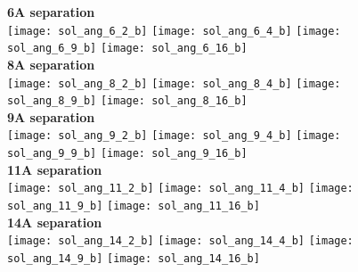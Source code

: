 \documentclass[journal=acsnano,manuscript=article]{achemso}
\begin{document}
\begin{figure}[h!]
	\centering
	\textbf{6A separation} \\
	\texttt{[image: sol\_ang\_6\_2\_b]}
	\texttt{[image: sol\_ang\_6\_4\_b]}
	\texttt{[image: sol\_ang\_6\_9\_b]}
	\texttt{[image: sol\_ang\_6\_16\_b]}
	\\ \textbf{8A separation} \\
	\texttt{[image: sol\_ang\_8\_2\_b]}
	\texttt{[image: sol\_ang\_8\_4\_b]}
	\texttt{[image: sol\_ang\_8\_9\_b]}
	\texttt{[image: sol\_ang\_8\_16\_b]}
	\\ \textbf{9A separation} \\
	\texttt{[image: sol\_ang\_9\_2\_b]}
	\texttt{[image: sol\_ang\_9\_4\_b]}
	\texttt{[image: sol\_ang\_9\_9\_b]}
	\texttt{[image: sol\_ang\_9\_16\_b]}
	\\ \textbf{11A separation} \\
	\texttt{[image: sol\_ang\_11\_2\_b]}
	\texttt{[image: sol\_ang\_11\_4\_b]}
	\texttt{[image: sol\_ang\_11\_9\_b]}
	\texttt{[image: sol\_ang\_11\_16\_b]}
	\\ \textbf{14A separation} \\
	\texttt{[image: sol\_ang\_14\_2\_b]}
	\texttt{[image: sol\_ang\_14\_4\_b]}
	\texttt{[image: sol\_ang\_14\_9\_b]}
	\texttt{[image: sol\_ang\_14\_16\_b]}
	\label{fig:ang_sol}
\end{figure}
\end{document}
